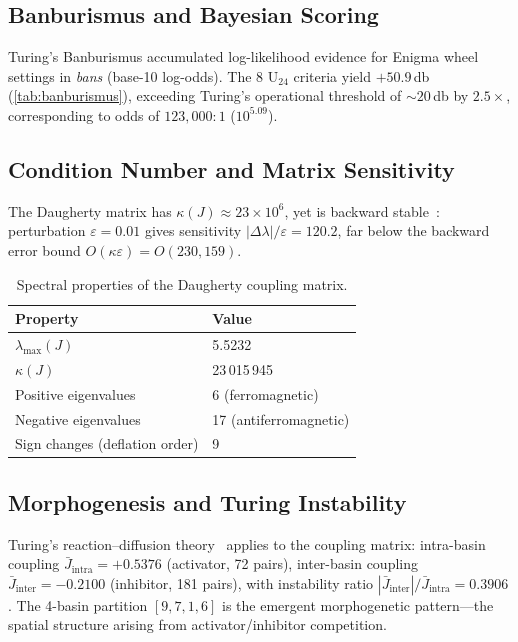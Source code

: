 \documentclass[11pt,a4paper]{article}
\theoremstyle{plain}
\theoremstyle{remark}
\begin{document}
\subsection{Banburismus and Bayesian Scoring}

Turing's Banburismus accumulated log-likelihood evidence for Enigma wheel
settings in \emph{bans} (base-10 log-odds).  The 8 $\mathrm{U}_{24}$
criteria yield $+50.9$\,db (\cref{tab:banburismus}), exceeding Turing's
operational threshold of ${\sim}20$\,db by $2.5\times$, corresponding to
odds of $123{,}000{:}1$ ($10^{5.09}$).

\subsection{Condition Number and Matrix Sensitivity}

The Daugherty matrix has $\kappa(J)\approx 23\times 10^6$, yet is backward
stable~\cite{turing1948}: perturbation $\varepsilon=0.01$ gives sensitivity
$|\Delta\lambda|/\varepsilon=120.2$, far below the backward error bound
$O(\kappa\varepsilon)=O(230{,}159)$.

\begin{table}[H]
\centering
\begin{tabular}{@{}ll@{}}
\toprule
Property & Value\\
\midrule
$\lambda_{\max}(J)$ & 5.5232\\
$\kappa(J)$ & 23\,015\,945\\
Positive eigenvalues & 6 (ferromagnetic)\\
Negative eigenvalues & 17 (antiferromagnetic)\\
Sign changes (deflation order) & 9\\
\bottomrule
\end{tabular}
\caption{Spectral properties of the Daugherty coupling matrix.}
\label{tab:spectral}
\end{table}

\subsection{Morphogenesis and Turing Instability}

Turing's reaction--diffusion theory~\cite{turing1952} applies to the
coupling matrix: intra-basin coupling $\bar J_{\mathrm{intra}}=+0.5376$
(activator, 72 pairs), inter-basin coupling
$\bar J_{\mathrm{inter}}=-0.2100$ (inhibitor, 181 pairs), with instability
ratio $|\bar J_{\mathrm{inter}}|/\bar J_{\mathrm{intra}}=0.3906$.
The 4-basin partition $[9,7,1,6]$ is the emergent morphogenetic
pattern---the spatial structure arising from activator/inhibitor competition.
\end{document}
